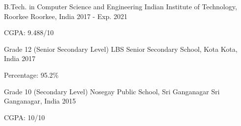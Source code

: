 

\begin{cventries}

  \cventry
    {B.Tech. in Computer Science and Engineering} %
    {Indian Institute of Technology, Roorkee} %
    {Roorkee, India} %
    {2017 - Exp. 2021} %
    {
      \begin{cvitems} %
        \item {CGPA: 9.488/10}
      \end{cvitems}
    }

  \cventry
    {Grade 12 (Senior Secondary Level)} %
    {LBS Senior Secondary School, Kota} %
    {Kota, India} %
    {2017} %
    {
      \begin{cvitems} %
        \item {Percentage: 95.2\%}
      \end{cvitems}
    }

  \cventry
    {Grade 10 (Secondary Level)} %
    {Nosegay Public School, Sri Ganganagar} %
    {Sri Ganganagar, India} %
    {2015} %
    {
      \begin{cvitems} %
        \item {CGPA: 10/10}
      \end{cvitems}
    }

\end{cventries}
